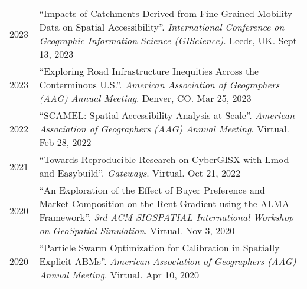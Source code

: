 \documentclass{acmcv}
\begin{document}
\begin{longtable}{p{0.1\linewidth} p{0.9\linewidth}}
        2023 & ``Impacts of Catchments Derived from Fine-Grained Mobility Data on Spatial Accessibility''. \textit{International Conference on Geographic Information Science (GIScience)}. Leeds, UK. Sept 13, 2023\\

        2023 & ``Exploring Road Infrastructure Inequities Across the Conterminous U.S.''. \textit{American Association of Geographers (AAG) Annual Meeting}. Denver, CO. Mar 25, 2023\\

        2022 & ``SCAMEL: Spatial Accessibility Analysis at Scale''. \textit{American Association of Geographers (AAG) Annual Meeting}. Virtual. Feb 28, 2022\\

        2021 & ``Towards Reproducible Research on CyberGISX with Lmod and Easybuild''. \textit{Gateways}. Virtual. Oct 21, 2022\\

        2020 & ``An Exploration of the Effect of Buyer Preference and Market Composition on the Rent Gradient using the ALMA Framework''. \textit{3rd ACM SIGSPATIAL International Workshop on GeoSpatial Simulation}. Virtual. Nov 3, 2020 \\

        2020 & ``Particle Swarm Optimization for Calibration in Spatially Explicit ABMs''. \textit{American Association of Geographers (AAG) Annual Meeting}. Virtual. Apr 10, 2020 \\




    \end{longtable}
    \vspace*{-0.2cm}
    
\end{document}
